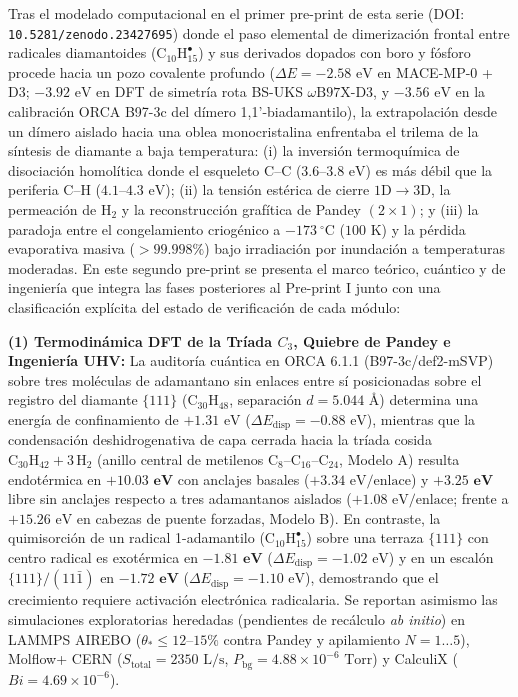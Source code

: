 \documentclass[10pt,twocolumn,a4paper]{article}
\begin{document}
\begin{@twocolumnfalse}
    {\footnotesize\linespread{1.02}\selectfont\setlength{\parskip}{0.25em}
    Tras el modelado computacional en el primer pre-print de esta serie (DOI: \texttt{10.5281/zenodo.23427695}) donde el paso elemental de dimerización frontal entre radicales diamantoides ($\text{C}_{10}\text{H}_{15}^\bullet$) y sus derivados dopados con boro y fósforo procede hacia un pozo covalente profundo ($\Delta E = -2.58\text{ eV}$ en MACE-MP-0 + D3; $-3.92\text{ eV}$ en DFT de simetría rota BS-UKS $\omega\text{B97X-D3}$, y $-3.56\text{ eV}$ en la calibración ORCA B97-3c del dímero 1,1'-biadamantilo), la extrapolación desde un dímero aislado hacia una oblea monocristalina enfrentaba el trilema de la síntesis de diamante a baja temperatura: (i) la inversión termoquímica de disociación homolítica donde el esqueleto $\text{C--C}$ ($3.6\text{--}3.8\text{ eV}$) es más débil que la periferia $\text{C--H}$ ($4.1\text{--}4.3\text{ eV}$); (ii) la tensión estérica de cierre $1\text{D} \to 3\text{D}$, la permeación de $\text{H}_2$ y la reconstrucción grafítica de Pandey $(2\times 1)$; y (iii) la paradoja entre el congelamiento criogénico a $-173\ ^\circ\text{C}$ ($100\text{ K}$) y la pérdida evaporativa masiva ($>99.998\%$) bajo irradiación por inundación a temperaturas moderadas. En este segundo pre-print se presenta el marco teórico, cuántico y de ingeniería que integra las fases posteriores al Pre-print I junto con una clasificación explícita del estado de verificación de cada módulo:

    \noindent\textbf{(1) Termodinámica DFT de la Tríada $C_3$, Quiebre de Pandey e Ingeniería UHV:} La auditoría cuántica en ORCA 6.1.1 (B97-3c/def2-mSVP) sobre tres moléculas de adamantano sin enlaces entre sí posicionadas sobre el registro del diamante $\{111\}$ ($\text{C}_{30}\text{H}_{48}$, separación $d = 5.044\text{ \AA}$) determina una energía de confinamiento de $+1.31\text{ eV}$ ($\Delta E_{\text{disp}} = -0.88\text{ eV}$), mientras que la condensación deshidrogenativa de capa cerrada hacia la tríada cosida $\text{C}_{30}\text{H}_{42} + 3\,\text{H}_2$ (anillo central de metilenos $\text{C}_8\text{--C}_{16}\text{--C}_{24}$, Modelo A) resulta endotérmica en $\mathbf{+10.03\text{ eV}}$ con anclajes basales ($+3.34\text{ eV/enlace}$) y $\mathbf{+3.25\text{ eV}}$ libre sin anclajes respecto a tres adamantanos aislados ($+1.08\text{ eV/enlace}$; frente a $+15.26\text{ eV}$ en cabezas de puente forzadas, Modelo B). En contraste, la quimisorción de un radical 1-adamantilo ($\text{C}_{10}\text{H}_{15}^\bullet$) sobre una terraza $\{111\}$ con centro radical es exotérmica en $\mathbf{-1.81\text{ eV}}$ ($\Delta E_{\text{disp}} = -1.02\text{ eV}$) y en un escalón $\{111\}/(11\bar{1})$ en $\mathbf{-1.72\text{ eV}}$ ($\Delta E_{\text{disp}} = -1.10\text{ eV}$), demostrando que el crecimiento requiere activación electrónica radicalaria. Se reportan asimismo las simulaciones exploratorias heredadas (pendientes de recálculo \textit{ab initio}) en LAMMPS AIREBO ($\theta_* \le 12\text{--}15\%$ contra Pandey y apilamiento $N=1\dots5$), Molflow+ CERN ($S_{\text{total}} = 2350\text{ L/s}$, $P_{\text{bg}} = 4.88 \times 10^{-6}\text{ Torr}$) y CalculiX ($Bi = 4.69 \times 10^{-6}$).

}
\end{@twocolumnfalse}
\end{document}
